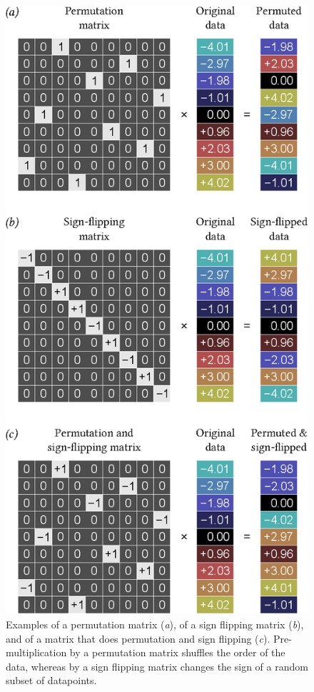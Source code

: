 \begin{figure}[!p]
\centering
\includegraphics{images/pmatrices.eps}
\caption[Examples of permutation and sign flipping matrix.]{Examples of a permutation matrix (\emph{a}), of a sign flipping matrix (\emph{b}), and of a matrix that does permutation and sign flipping (\emph{c}). Pre-multiplication by a permutation matrix shuffles the order of the data, whereas by a sign flipping matrix changes the sign of a random subset of datapoints.}
\label{fig:perm:pmatrices}
\end{figure}

